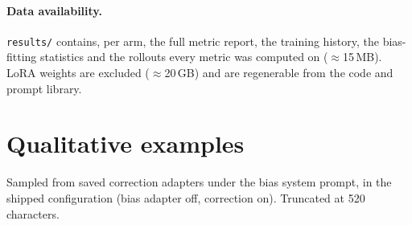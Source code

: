 \documentclass{article}
\begin{document}
\paragraph{Data availability.} \texttt{results/} contains, per arm, the full
metric report, the training history, the bias-fitting statistics and the
rollouts every metric was computed on ($\approx$15\,MB). LoRA weights are
excluded ($\approx$20\,GB) and are regenerable from the code and prompt library.

\section{Qualitative examples}
\label{app:examples}
Sampled from saved correction adapters under the bias system prompt, in the
shipped configuration (bias adapter off, correction on). Truncated at 520
characters.


\end{document}
